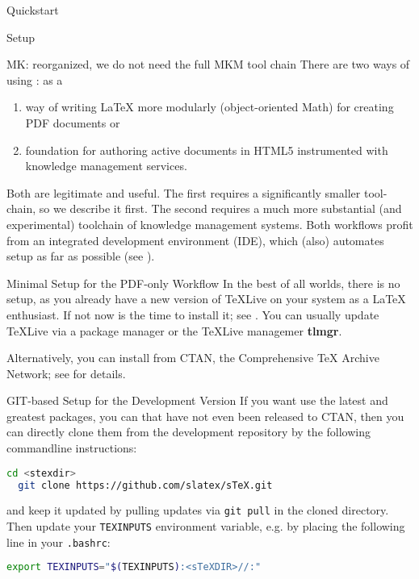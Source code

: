\begin{sfragment}{Quickstart}
  
  \begin{sfragment}{Setup}
    \begin{newpart}{MK: reorganized, we do not need the full MKM tool chain}
      There are two ways of using \sTeX: as a 
      \begin{enumerate}
      \item way of writing {\LaTeX} more modularly (object-oriented Math) for creating PDF
        documents or
      \item foundation for authoring active documents in HTML5 instrumented with knowledge
        management services. 
      \end{enumerate}
      Both are legitimate and useful. The first requires a significantly smaller
      tool-chain, so we describe it first. The second requires a much more substantial
      (and experimental) toolchain of knowledge management systems. Both workflows profit
      from an integrated development environment (IDE), which (also) automates setup as
      far as possible (see ). 

      \begin{sfragment}[id=sec.minimal-setup]{Minimal Setup for the PDF-only Workflow}
        In the best of all worlds, there is no setup, as you already have a new version of
        {\TeX}Live on your system as a {\LaTeX} enthusiast. If not now is the time to
        install it; see \cite{TeXLive:on}. You can usually update {\TeX}Live via a package
        manager or the {\TeX}Live managemer \textbf{tlmgr}.

        Alternatively, you can install \sTeX from CTAN, the Comprehensive {\TeX} Archive
        Network; see \cite{stexCTAN:on} for details.
      \end{sfragment}

      \begin{sfragment}[id=sec.git-setup]{GIT-based Setup for the \sTeX Development Version}
        If you want use the latest and greatest \sTeX packages, you can that have not even
        been released to CTAN, then you can directly clone them from the \sTeX development
        repository \cite{sTeX:github:on} by the following commandline instructions: 
\begin{lstlisting}[language=bash]
  cd <stexdir>
  git clone https://github.com/slatex/sTeX.git
\end{lstlisting}
       and keep it updated by pulling updates via \lstinline|git pull| in the cloned \sTeX
       directory.
       Then update your \lstinline|TEXINPUTS| environment variable, e.g. by placing the following line in your \lstinline|.bashrc|:
\begin{lstlisting}[language=bash]
export TEXINPUTS="$(TEXINPUTS):<sTeXDIR>//:"
\end{lstlisting}       
      \end{sfragment}


\end{newpart}
\end{sfragment}
\end{sfragment}
